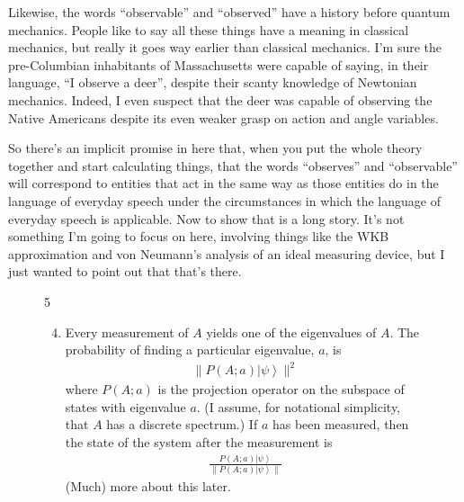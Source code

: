 \documentclass[twocolumn,prb]{revtex4}
\newcommand{\ket}[1]{\left|#1\right\rangle}
\begin{document}
Likewise, the words ``observable'' and ``observed'' have a history before quantum mechanics. People like to say all these things have a meaning in classical mechanics, but really it goes way earlier than classical mechanics. I'm sure the pre-Columbian inhabitants of Massachusetts were capable of saying, in their language, ``I observe a deer'', despite their scanty knowledge of Newtonian mechanics. Indeed, I even suspect that the deer was capable of observing the Native Americans despite its even weaker grasp on action and angle variables.

So there's an implicit promise in here that, when you put the whole theory together and start calculating things, that the words ``observes'' and ``observable'' will correspond to entities that act in the same way as those entities do in the language of everyday speech under the circumstances in which the language of everyday speech is applicable. Now to show that is a long story. It's not something I'm going to focus on here, involving things like the WKB approximation and von Neumann's analysis of an ideal measuring device\cite{Neumann32}, but I just wanted to point out that that's there.

\begin{figure}[htb] 
\begin{mdframed}
  \vspace{5pt}\hfill 5\\[-18pt]
  \begin{raggedright}
  \begin{enumerate}[label=(\roman*)]
    \setcounter{enumi}{3}
  \item Every measurement of $A$ yields one of the eigenvalues of $A$.  The probability of finding a particular eigenvalue, $a$, is 
    \begin{align}
      \nonumber
      \lVert P(A;a)\ket{\psi}\rVert^2
    \end{align}
    where $P(A;a)$ is the projection operator on the subspace of states with eigenvalue $a$. (I assume, for notational simplicity, that $A$ has a discrete spectrum.) If $a$ has been measured, then the state of the system after the measurement is
    \begin{align}
      \nonumber
      \frac{P(A;a)\ket{\psi}}{\lVert P(A;a)\ket{\psi}\rVert}
    \end{align}
    (Much) more about this later.
  \end{enumerate}
  \end{raggedright}
  \vspace{6pt}
\end{mdframed}
\end{figure}
\end{document}
